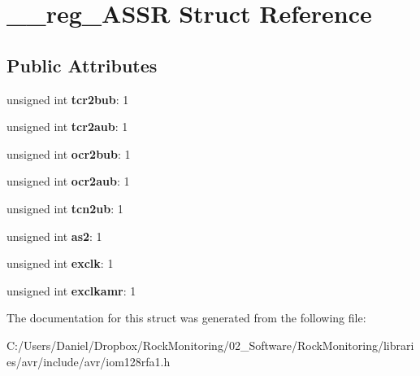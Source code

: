 \hypertarget{struct____reg___a_s_s_r}{}\section{\+\_\+\+\_\+reg\+\_\+\+A\+S\+SR Struct Reference}
\label{struct____reg___a_s_s_r}
\subsection*{Public Attributes}
\begin{DoxyCompactItemize}
\item 
unsigned int {\bfseries tcr2bub}\+: 1\hypertarget{struct____reg___a_s_s_r_a52d871d8c074baf3882527efa124ce82}{}\label{struct____reg___a_s_s_r_a52d871d8c074baf3882527efa124ce82}

\item 
unsigned int {\bfseries tcr2aub}\+: 1\hypertarget{struct____reg___a_s_s_r_ac62c8652219241d03b81de3081efecf2}{}\label{struct____reg___a_s_s_r_ac62c8652219241d03b81de3081efecf2}

\item 
unsigned int {\bfseries ocr2bub}\+: 1\hypertarget{struct____reg___a_s_s_r_aa23c1af2f91cf4d55df60b0d36a48af8}{}\label{struct____reg___a_s_s_r_aa23c1af2f91cf4d55df60b0d36a48af8}

\item 
unsigned int {\bfseries ocr2aub}\+: 1\hypertarget{struct____reg___a_s_s_r_aa7dfa6a3f9b22587cc5098db9d4d5f77}{}\label{struct____reg___a_s_s_r_aa7dfa6a3f9b22587cc5098db9d4d5f77}

\item 
unsigned int {\bfseries tcn2ub}\+: 1\hypertarget{struct____reg___a_s_s_r_ab953cc3ca6b03a4d4e48ac87aff09033}{}\label{struct____reg___a_s_s_r_ab953cc3ca6b03a4d4e48ac87aff09033}

\item 
unsigned int {\bfseries as2}\+: 1\hypertarget{struct____reg___a_s_s_r_a6e9ad745e3ee3ffa4075e768170440e0}{}\label{struct____reg___a_s_s_r_a6e9ad745e3ee3ffa4075e768170440e0}

\item 
unsigned int {\bfseries exclk}\+: 1\hypertarget{struct____reg___a_s_s_r_a4ca976c307822e9d8516fe8ca42bd34f}{}\label{struct____reg___a_s_s_r_a4ca976c307822e9d8516fe8ca42bd34f}

\item 
unsigned int {\bfseries exclkamr}\+: 1\hypertarget{struct____reg___a_s_s_r_a7c25c4fdec386c7a31225f82d14d51ee}{}\label{struct____reg___a_s_s_r_a7c25c4fdec386c7a31225f82d14d51ee}

\end{DoxyCompactItemize}


The documentation for this struct was generated from the following file\+:\begin{DoxyCompactItemize}
\item 
C\+:/\+Users/\+Daniel/\+Dropbox/\+Rock\+Monitoring/02\+\_\+\+Software/\+Rock\+Monitoring/libraries/avr/include/avr/iom128rfa1.\+h\end{DoxyCompactItemize}

